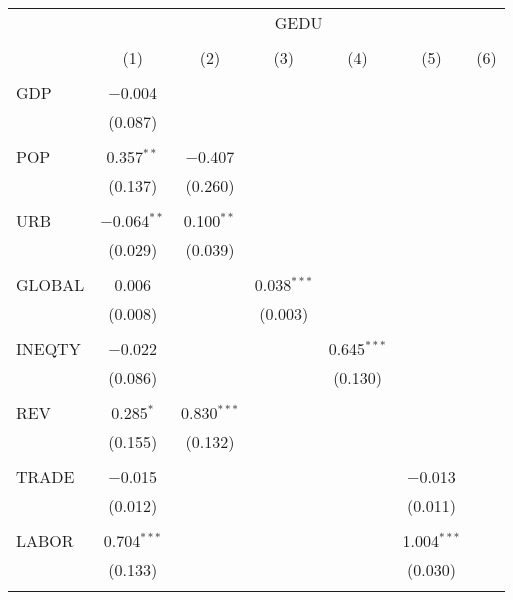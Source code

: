 \documentclass[8pt]{extarticle}
\begin{document}
\begin{landscape}
\thispagestyle{plain}




\begin{table}[!htbp] \centering 

  \label{} 
\begin{tabular}{@{\extracolsep{5pt}}lcccccc} 
 \\[-1.8ex] & \multicolumn{6}{c}{GEDU} \\ 
\\[-1.8ex] & (1) & (2) & (3) & (4) & (5) & (6)\\ 
\hline \\[-1.8ex] 
 GDP & $-$0.004 &  &  &  &  &  \\ 
  & (0.087) &  &  &  &  &  \\ 
  & & & & & & \\ 
 POP & 0.357$^{**}$ & $-$0.407 &  &  &  &  \\ 
  & (0.137) & (0.260) &  &  &  &  \\ 
  & & & & & & \\ 
 URB & $-$0.064$^{**}$ & 0.100$^{**}$ &  &  &  &  \\ 
  & (0.029) & (0.039) &  &  &  &  \\ 
  & & & & & & \\ 
 GLOBAL & 0.006 &  & 0.038$^{***}$ &  &  &  \\ 
  & (0.008) &  & (0.003) &  &  &  \\ 
  & & & & & & \\ 
 INEQTY & $-$0.022 &  &  & 0.645$^{***}$ &  &  \\ 
  & (0.086) &  &  & (0.130) &  &  \\ 
  & & & & & & \\ 
 REV & 0.285$^{*}$ & 0.830$^{***}$ &  &  &  &  \\ 
  & (0.155) & (0.132) &  &  &  &  \\ 
  & & & & & & \\ 
 TRADE & $-$0.015 &  &  &  & $-$0.013 &  \\ 
  & (0.012) &  &  &  & (0.011) &  \\ 
  & & & & & & \\ 
 LABOR & 0.704$^{***}$ &  &  &  & 1.004$^{***}$ &  \\ 
  & (0.133) &  &  &  & (0.030) &  \\ 
  & & & & & & \\ 

\end{tabular}
\end{table}
\end{landscape}
\end{document}
